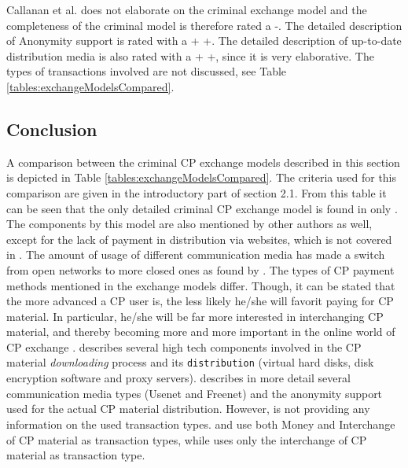\documentclass{sig-alternate-br}
\begin{document}
Callanan et al. does not elaborate on the criminal exchange model and the completeness of the criminal model is therefore rated a -. The detailed description of Anonymity support is rated with a + +. The detailed description of up-to-date distribution media is also rated with a + +, since it is very elaborative. The types of transactions involved are not discussed, see Table \ref{tables:exchangeModelsCompared}.

\subsection{Conclusion}
A comparison between the criminal CP exchange models described in this section is depicted in Table \ref{tables:exchangeModelsCompared}. The criteria used for this comparison are given in the introductory part of section 2.1.
From this table it can be seen that the only detailed criminal CP exchange model is found in only \cite{en2011phishing}. The components by this model are also mentioned by other authors as well, except for the lack of payment in distribution via websites, which is not covered in \cite{en2011phishing}. The amount of usage of different communication media has made a switch from open networks to more closed ones as found by \cite{wortley2006child,wijk2009achter}. The types of CP payment methods mentioned in the exchange models differ. Though, it can be stated that the more advanced a CP user is, the less likely he/she will favorit paying for CP material. In particular, he/she will be far more interested in interchanging CP material, and thereby becoming more and more important in the online world of CP exchange \cite{wijk2009achter,quayle2002paedophiles,krone2005international,en2011phishing}. \cite{wijk2009achter} describes several high tech components involved in the CP material \textit{downloading} process and its \texttt{distribution} (virtual hard disks, disk encryption software and proxy servers). \cite{callanan2009internet} describes in more detail several communication media types (Usenet and Freenet) and the anonymity support used for the actual CP material distribution. However, \cite{callanan2009internet} is not providing any information on the used transaction types. \cite{en2011phishing} and \cite{wijk2009achter} use both Money and Interchange of CP material as transaction types, while \cite{wortley2006child} uses only the interchange of CP material as transaction type.
\end{document}
